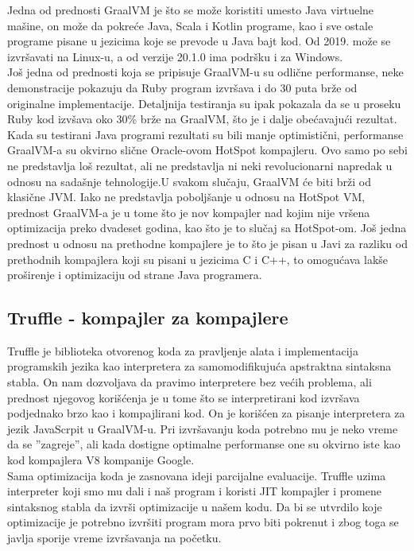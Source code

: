 \documentclass[a4paper]{article}
\begin{document}
Jedna od prednosti GraalVM je što se može koristiti umesto Java virtuelne mašine, on može da pokreće Java, Scala i Kotlin programe, kao i sve ostale programe pisane u jezicima koje se prevode u Java bajt kod. Od 2019. može se izvršavati na Linux-u, a od verzije 20.1.0 ima podršku i za Windows. \\

Još jedna od prednosti koja se pripisuje GraalVM-u su odlične performanse, neke demonstracije pokazuju da Ruby program izvršava i do 30 puta brže od originalne implementacije.
Detaljnija testiranja su ipak pokazala da se u proseku Ruby kod izvšava oko 30\%  brže na GraalVM, što je i dalje obećavajući rezultat. \\

Kada su testirani Java programi rezultati su bili manje optimistični, performanse GraalVM-a su okvirno slične Oracle-ovom HotSpot kompajleru. Ovo samo po sebi ne predstavlja loš rezultat, ali ne predstavlja ni neki revolucionarni napredak u odnosu na sadašnje tehnologije.U svakom slučaju, GraalVM će biti brži od klasične JVM. Iako ne predstavlja poboljšanje u odnosu na HotSpot VM, prednost GraalVM-a je u tome što je nov kompajler nad kojim nije vršena optimizacija preko dvadeset godina, kao što je to slučaj sa HotSpot-om. Još jedna prednost u odnosu na prethodne kompajlere je to što je pisan u Javi za razliku od prethodnih kompajlera koji su pisani u jezicima C i C++, to omogućava lakše proširenje i optimizaciju od strane Java programera.

\subsection{Truffle - kompajler za kompajlere}
\label{Truffle - kompajler za kompajlere}

Truffle je biblioteka otvorenog koda za pravljenje alata i implementacija programskih jezika kao interpretera za samomodifikujuća apstraktna sintaksna stabla. On nam dozvoljava 
da pravimo interpretere bez većih problema, ali prednost njegovog korišćenja je u tome što se interpretirani kod izvršava podjednako brzo kao i kompajlirani kod.
On je korišćen za pisanje interpretera za jezik JavaScrpit u GraalVM-u. Pri izvršavanju koda potrebno mu je neko vreme da se ''zagreje'', ali kada dostigne optimalne performanse
one su okvirno iste kao kod kompajlera V8 kompanije Google. \\

Sama optimizacija koda je zasnovana ideji parcijalne evaluacije. Truffle uzima interpreter koji smo mu dali i naš program i koristi JIT kompajler i promene sintaksnog stabla da izvrši optimizacije u našem kodu. Da bi se utvrdilo koje optimizacije je potrebno izvršiti program mora prvo biti pokrenut i zbog toga se javlja sporije vreme izvršavanja na početku.\\
\end{document}
